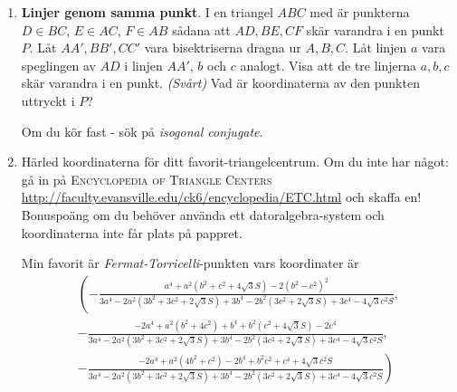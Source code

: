 \begin{enumerate}
\item \textbf{Linjer genom samma punkt}. 
	I en triangel $ABC$ med är punkterna $D \in BC$, $E \in AC$, $F \in AB$ sådana att
	$AD, BE, CF$ skär varandra i en punkt $P$. Låt $AA', BB', CC'$ vara bisektriserna 
	dragna ur $A, B, C$. Låt linjen $a$ vara speglingen av $AD$ i linjen $AA'$, $b$ och $c$ analogt.
	Visa att de tre linjerna $a,b,c$ skär varandra i en punkt. \textit{(Svårt)} Vad är koordinaterna av den
	punkten uttryckt i $P$? 

	{\tiny{Om du kör fast - sök på \textit{isogonal conjugate}}}.

\item Härled koordinaterna för ditt favorit-triangelcentrum. Om du inte har något: 
	gå in på \textsc{Encyclopedia of Triangle Centers} \url{http://faculty.evansville.edu/ck6/encyclopedia/ETC.html}
	och skaffa en! Bonuspoäng om du behöver använda ett datoralgebra-system och koordinaterna inte får
	plats på pappret.
        
        Min favorit är \textit{Fermat-Torricelli}-punkten vars koordinater är 
        \begin{eqnarray*}
        \left(-\frac{a^4+a^2 \left(b^2+c^2+4 \sqrt{3} S\right)-2 \left(b^2-c^2\right)^2}{3 a^4-2 a^2 \left(3 b^2+3 c^2+2 \sqrt{3} S\right)+3 b^4-2 b^2 \left(3 c^2+2 \sqrt{3} S\right)+3 c^4-4 \sqrt{3} c^2 S},\right.\\
        -\frac{-2 a^4+a^2 \left(b^2+4 c^2\right)+b^4+b^2 \left(c^2+4 \sqrt{3} S\right)-2 c^4}{3 a^4-2 a^2 \left(3 b^2+3 c^2+2 \sqrt{3} S\right)+3 b^4-2 b^2 \left(3 c^2+2 \sqrt{3} S\right)+3 c^4-4 \sqrt{3} c^2 S},\\
        \left.-\frac{-2 a^4+a^2 \left(4 b^2+c^2\right)-2 b^4+b^2 c^2+c^4+4 \sqrt{3} c^2 S}{3 a^4-2 a^2 \left(3 b^2+3 c^2+2 \sqrt{3} S\right)+3 b^4-2 b^2 \left(3 c^2+2 \sqrt{3} S\right)+3 c^4-4 \sqrt{3} c^2 S}\right)
        \end{eqnarray*}



\end{enumerate}





